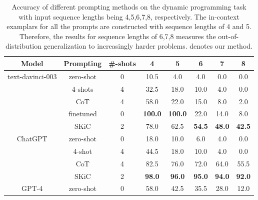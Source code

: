 \documentclass{article} \usepackage{arxiv}
\begin{document}
\begin{table}[t]
\caption{Accuracy of different prompting methods on the dynamic programming task with input sequence lengths being 4,5,6,7,8, respectively. The in-context examplars for all the prompts are constructed with sequence lengths of 4 and 5. Therefore, the results for sequence lengths of 6,7,8 measures the out-of-distribution generalization to increasingly harder problems.  denotes our method.} \label{Tab:dp_results}
\centering
\begin{tabular}{c|c|c|cc|ccc} \toprule
\textbf{Model}               & \textbf{Prompting}&\textbf{\#-shots} & \multicolumn{1}{c}{\textbf{4}} & \textbf{5}  & \textbf{6}  & \textbf{7}  & \textbf{8}  \\ \midrule\midrule 

\multirow{5}{*}{text-davinci-003} & zero-shot  &0        & 10.5                              & 4.0           & 4.0           & 0.0           & 0.0           \\
                          & 4-shots     &4       & 32.5                             & 18.0          & 10.0          & 4.0           & 0.0           \\
                          & CoT     &4           & 58.0                             & 22.0          & 15.0          & 8.0           & 2.0           \\
                          &finetuned & 0 &\textbf{100.0} &\textbf{100.0} &22.0 &14.0 &8.0\\
                          & SKiC   &2             & 78.0                    & 62.5 & \textbf{54.5} & \textbf{48.0} & \textbf{42.5} \\ \midrule
\multirow{4}{*}{ChatGPT}  & zero-shot   &0       & 18.0                             & 10.0          & 6.0           & 4.0           & 0.0           \\
                          & 4-shot    &4         & 44.5                            & 18.0          & 10.0          & 4.0           & 0.0           \\
                          & CoT    &4            & 82.5                             & 76.0          & 72.0        & 64.0           & 55.5           \\
                          & SKiC    &2            & \textbf{98.0}                    & \textbf{96.0} & \textbf{95.0} & \textbf{94.0} & \textbf{92.0} \\ \midrule
\multirow{4}{*}{GPT-4}     & zero-shot   &0       & 58.0                             & 42.5          & 35.5          & 28.0          & 12.0          \\

\end{tabular}
\end{table}
\end{document}
